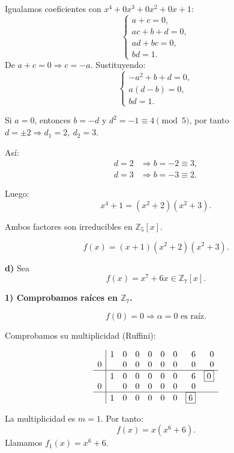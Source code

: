 \documentclass[a4paper,12pt]{article}
\begin{document}
\begin{ejercicio}[title=Ejercicio 52]
Igualamos coeficientes con \(x^4 + 0x^3 + 0x^2 + 0x + 1\):
\[
\begin{cases}
a + c = 0, \\
ac + b + d = 0, \\
ad + bc = 0, \\
bd = 1.
\end{cases}
\]
De \(a + c = 0 \Rightarrow c = -a\). Sustituyendo:
\[
\begin{cases}
-a^2 + b + d = 0, \\
a(d - b) = 0, \\
bd = 1.
\end{cases}
\]

Si \(a = 0\), entonces \(b = -d\) y \(d^2 = -1 \equiv 4 \pmod{5}\),  
por tanto \(d = \pm 2 \Rightarrow d_1 = 2,\ d_2 = 3.\)

Así:
\[
\begin{aligned}
d = 2 &\Rightarrow b = -2 \equiv 3,\\
d = 3 &\Rightarrow b = -3 \equiv 2.
\end{aligned}
\]

Luego:
\[
x^4 + 1 = (x^2 + 2)(x^2 + 3).
\]

Ambos factores son irreducibles en \(\mathbb{Z}_5[x]\).

\[
\boxed{f(x) = (x + 1)(x^2 + 2)(x^2 + 3).}
\]

\textbf{d)} Sea 
\[
f(x) = x^7 + 6x \in \mathbb{Z}_7[x].
\]

\textbf{1) Comprobamos raíces en $\mathbb{Z}_7$.}

\[
f(0) = 0 \Rightarrow \alpha = 0 \text{ es raíz.}
\]

Comprobamos su multiplicidad (Ruffini):

\[
\begin{array}{r|rrrrrrrr}
  & 1 & 0 & 0 & 0 & 0 & 0 & 6 & 0 \\
0 &   & 0 & 0 & 0 & 0 & 0 & 0 & 0 \\
\hline
  & 1 & 0 & 0 & 0 & 0 & 0 & 6 & \boxed{0} \\
0 &   & 0 & 0 & 0 & 0 & 0 & 0 \\
\hline
  & 1 & 0 & 0 & 0 & 0 & 0 & \boxed{6}
\end{array}
\]

La multiplicidad es \(m = 1\).  
Por tanto:
\[
f(x) = x(x^6 + 6).
\]
Llamamos \(f_1(x) = x^6 + 6.\)

\end{ejercicio}
\end{document}

